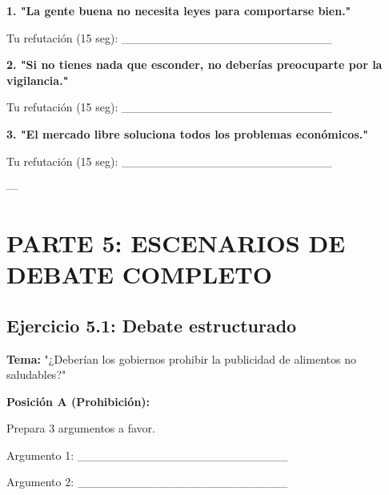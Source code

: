 \documentclass[a4paper,11pt]{article}
\begin{document}
\vspace{0.2cm}

\textbf{1. "La gente buena no necesita leyes para comportarse bien."}

Tu refutación (15 seg): _________________________

\vspace{0.2cm}

\textbf{2. "Si no tienes nada que esconder, no deberías preocuparte por la vigilancia."}

Tu refutación (15 seg): _________________________

\vspace{0.2cm}

\textbf{3. "El mercado libre soluciona todos los problemas económicos."}

Tu refutación (15 seg): _________________________

\vspace{0.2cm}

---

\vspace{0.2cm}

\section{PARTE 5: ESCENARIOS DE DEBATE COMPLETO}

\vspace{0.2cm}

\subsection{Ejercicio 5.1: Debate estructurado}

\vspace{0.2cm}

\textbf{Tema:} "¿Deberían los gobiernos prohibir la publicidad de alimentos no saludables?"

\vspace{0.2cm}

\textbf{Posición A (Prohibición):}

Prepara 3 argumentos a favor.

\vspace{0.2cm}

Argumento 1: _________________________

\vspace{0.2cm}

Argumento 2: _________________________

\vspace{0.2cm}
\end{document}
